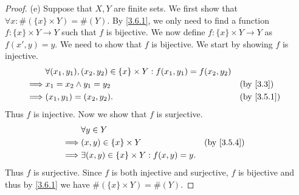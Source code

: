 \begin{proof}{(e)}
  Suppose that \(X, Y\) are finite sets.
  We first show that \(\forall x : \#(\{x\} \times Y) = \#(Y)\).
  By \cref{3.6.1}, we only need to find a function \(f : \{x\} \times Y \to Y\) such that \(f\) is bijective.
  We now define \(f : \{x\} \times Y \to Y\) as \(f(x', y) = y\).
  We need to show that \(f\) is bijective.
  We start by showing \(f\) is injective.
  \begin{align*}
             & \forall (x_1, y_1), (x_2, y_2) \in \{x\} \times Y : f(x_1, y_1) = f(x_2, y_2)                             \\
    \implies & x_1 = x_2 \land y_1 = y_2                                                     &  & \text{(by \cref{3.3})} \\
    \implies & (x_1, y_1) = (x_2, y_2).                                                      &  & \by{3.5.1}
  \end{align*}
  Thus \(f\) is injective.
  Now we show that \(f\) is surjective.
  \begin{align*}
             & \forall y \in Y                                                  \\
    \implies & (x, y) \in \{x\} \times Y                        &  & \by{3.5.4} \\
    \implies & \exists (x, y) \in \{x\} \times Y : f(x, y) = y.
  \end{align*}
  Thus \(f\) is surjective.
  Since \(f\) is both injective and surjective, \(f\) is bijective and thus by \cref{3.6.1} we have \(\#(\{x\} \times Y) = \#(Y)\).


\end{proof}
